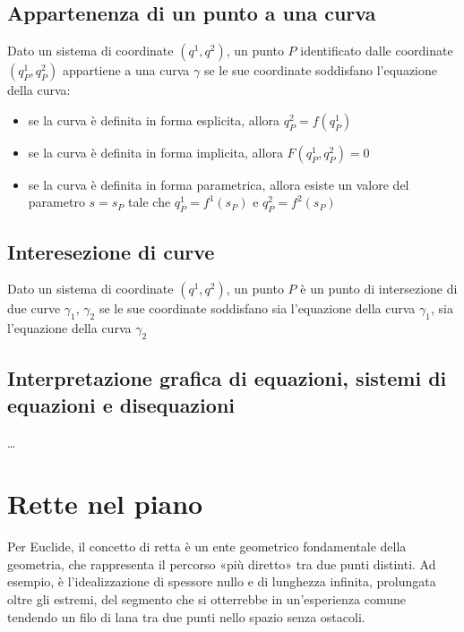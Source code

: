 \documentclass[letterpaper,10pt,italian]{jupyterBook}
\begin{document}
\subsection{Appartenenza di un punto a una curva}
\label{\detokenize{ch/analytic_geometry/analytic_geometry_2d/curves:appartenenza-di-un-punto-a-una-curva}}
\sphinxAtStartPar
Dato un sistema di coordinate \((q^1, q^2)\), un punto \(P\) identificato dalle coordinate \((q^1_P, q^2_P)\) appartiene a una curva \(\gamma\) se le sue coordinate soddisfano l’equazione della curva:
\begin{itemize}
\item {} 
\sphinxAtStartPar
se la curva è definita in forma esplicita, allora \(q^2_P = f(q^1_P)\)

\item {} 
\sphinxAtStartPar
se la curva è definita in forma implicita, allora \(F(q^1_P, q^2_P)=0\)

\item {} 
\sphinxAtStartPar
se la curva è definita in forma parametrica, allora esiste un valore del parametro \(s=s_P\) tale che \(q^1_P = f^1(s_P)\) e \(q^2_P = f^2(s_P)\)

\end{itemize}


\subsection{Interesezione di curve}
\label{\detokenize{ch/analytic_geometry/analytic_geometry_2d/curves:interesezione-di-curve}}
\sphinxAtStartPar
Dato un sistema di coordinate \((q^1, q^2)\), un punto \(P\) è un punto di intersezione di due curve \(\gamma_1\), \(\gamma_2\) se le sue coordinate soddisfano sia l’equazione della curva \(\gamma_1\), sia l’equazione della curva \(\gamma_2\)


\subsection{Interpretazione grafica di equazioni, sistemi di equazioni e disequazioni}
\label{\detokenize{ch/analytic_geometry/analytic_geometry_2d/curves:interpretazione-grafica-di-equazioni-sistemi-di-equazioni-e-disequazioni}}
\sphinxAtStartPar
…

\sphinxstepscope


\section{Rette nel piano}
\label{\detokenize{ch/analytic_geometry/analytic_geometry_2d/lines:rette-nel-piano}}\label{\detokenize{ch/analytic_geometry/analytic_geometry_2d/lines:geometry-analytic-2d-lines}}\label{\detokenize{ch/analytic_geometry/analytic_geometry_2d/lines::doc}}
\sphinxAtStartPar
Per Euclide, il concetto di retta è un ente geometrico fondamentale della geometria, che rappresenta il percorso «più diretto» tra due punti distinti. Ad esempio, è l’idealizzazione di spessore nullo e di lunghezza infinita, prolungata oltre gli estremi, del segmento che si otterrebbe in un’esperienza comune tendendo un filo di lana tra due punti nello spazio senza ostacoli.
\end{document}
